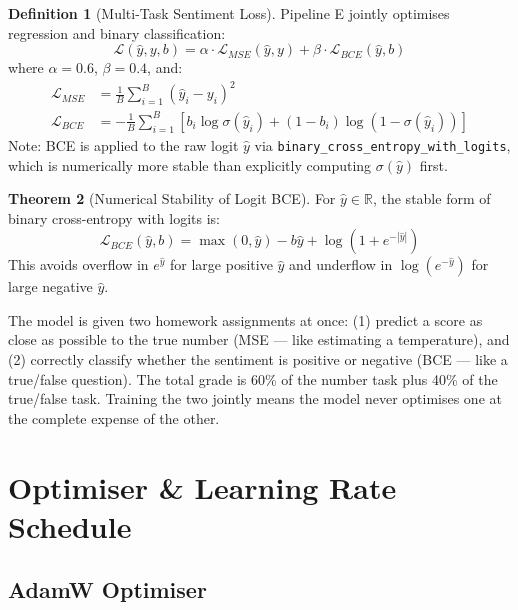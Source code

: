 \documentclass[12pt,a4paper]{article}
\theoremstyle{definition}
\newtheorem{theorem}{Theorem}[section]
\newtheorem{definition}[theorem]{Definition}
\begin{document}
\begin{definition}[Multi-Task Sentiment Loss]
Pipeline E jointly optimises regression and binary classification:
$$\mathcal{L}(\hat{y}, y, b) = \alpha \cdot \mathcal{L}_{MSE}(\hat{y}, y) + \beta \cdot \mathcal{L}_{BCE}(\hat{y}, b)$$
where $\alpha = 0.6$, $\beta = 0.4$, and:
\begin{align}
\mathcal{L}_{MSE} &= \frac{1}{B}\sum_{i=1}^{B}\left(\hat{y}_i - y_i\right)^2 \\
\mathcal{L}_{BCE} &= -\frac{1}{B}\sum_{i=1}^{B}\left[b_i \log \sigma(\hat{y}_i) + (1-b_i)\log(1-\sigma(\hat{y}_i))\right]
\end{align}
Note: BCE is applied to the raw logit $\hat{y}$ via \texttt{binary\_cross\_entropy\_with\_logits}, which is numerically more stable than explicitly computing $\sigma(\hat{y})$ first.
\end{definition}

\begin{theorem}[Numerical Stability of Logit BCE]
For $\hat{y} \in \mathbb{R}$, the stable form of binary cross-entropy with logits is:
$$\mathcal{L}_{BCE}(\hat{y}, b) = \max(0,\hat{y}) - b\hat{y} + \log(1 + e^{-|\hat{y}|})$$
This avoids overflow in $e^{\hat{y}}$ for large positive $\hat{y}$ and underflow in $\log(e^{-\hat{y}})$ for large negative $\hat{y}$.
\end{theorem}

\begin{laymanbox}
The model is given two homework assignments at once: (1) predict a score as close as possible to the true number (MSE — like estimating a temperature), and (2) correctly classify whether the sentiment is positive or negative (BCE — like a true/false question). The total grade is 60\% of the number task plus 40\% of the true/false task. Training the two jointly means the model never optimises one at the complete expense of the other.
\end{laymanbox}

\section{Optimiser \& Learning Rate Schedule}

\subsection{AdamW Optimiser}
\end{document}
